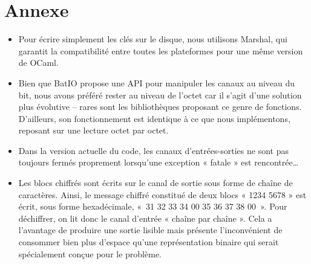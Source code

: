\section{Annexe}
\label{annexe_A}

\begin{itemize}
\item Pour écrire simplement les clés sur le disque, nous utilisons Marshal, qui garantit la compatibilité entre toutes les plateformes pour une même version de OCaml.
\item Bien que BatIO propose une API pour manipuler les canaux au niveau du bit, nous avons préféré rester au niveau de l'octet car il s'agit d'une solution plus évolutive – rares sont les bibliothèques proposant ce genre de fonctions. D'ailleurs, son fonctionnement est identique à ce que nous implémentons, reposant sur une lecture octet par octet.
\item Dans la version actuelle du code, les canaux d'entrées-sorties ne sont pas toujours fermés proprement lorsqu'une exception « fatale » est rencontrée…
\item Les blocs chiffrés sont écrits sur le canal de sortie sous forme de chaîne de caractères. Ainsi, le message chiffré constitué de deux blocs « 1234 5678 » est écrit, sous forme hexadécimale, «~31 32 33 34 00 35 36 37 38 00~». Pour déchiffrer, on lit donc le canal d'entrée « chaîne par chaîne ». Cela a l'avantage de produire une sortie lisible mais présente l'inconvénient de consommer bien plus d'espace qu'une représentation binaire qui serait spécialement conçue pour le problème.
\end{itemize}
